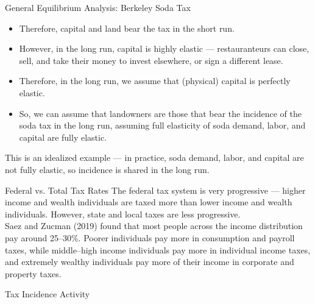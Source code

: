 \documentclass[8pt]{extarticle}
\begin{document}
\begin{problem}{General Equilibrium Analysis: Berkeley Soda Tax}
\begin{description}
\begin{itemize}
          \item Therefore, capital and land bear the tax in the short run.
        \end{itemize}
      \item[Long Run Incidence:]\hfill
        \begin{itemize}
          \item However, in the long run, capital is highly elastic --- restauranteurs can close, sell, and take their money to invest elsewhere, or sign a different lease.
          \item Therefore, in the long run, we assume that (physical) capital is perfectly elastic.
          \item So, we can assume that landowners are those that bear the incidence of the soda tax in the long run, assuming full elasticity of soda demand, labor, and capital are fully elastic.
        \end{itemize}
    \end{description}
    This is an idealized example --- in practice, soda demand, labor, and capital are not fully elastic, so incidence is shared in the long run.
  \end{problem}
  \begin{problem}{Federal vs. Total Tax Rates}
    The federal tax system is very progressive --- higher income and wealth individuals are taxed more than lower income and wealth individuals. However, state and local taxes are less progressive.\\

    Saez and Zucman (2019) found that most people across the income distribution pay around 25--30\%. Poorer individuals pay more in consumption and payroll taxes, while middle--high income individuals pay more in individual income taxes, and extremely wealthy individuals pay more of their income in corporate and property taxes.
  \end{problem}
  \begin{problem}{Tax Incidence Activity}
    \begin{tcbraster}[raster columns = 1,colframe = black!75!white,colback=white]
    \end{tcbraster}
  \end{problem}
\end{document}
